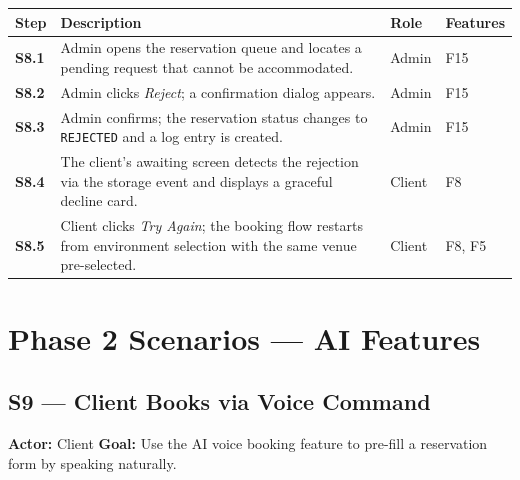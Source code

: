 \documentclass[12pt,a4paper]{article}
\begin{document}
\begin{longtable}{>{\bfseries}l L{6.5cm} l L{3cm}}
    \toprule
    Step & Description & Role & Features \\
    \midrule
    S8.1 & Admin opens the reservation queue and locates a pending
           request that cannot be accommodated. & Admin & F15 \\
    S8.2 & Admin clicks \emph{Reject}; a confirmation dialog appears. & Admin & F15 \\
    S8.3 & Admin confirms; the reservation status changes to
           \texttt{REJECTED} and a log entry is created. & Admin & F15 \\
    S8.4 & The client's awaiting screen detects the rejection via the
           storage event and displays a graceful decline card. & Client & F8 \\
    S8.5 & Client clicks \emph{Try Again}; the booking flow restarts
           from environment selection with the same venue pre-selected. & Client & F8, F5 \\
    \bottomrule
\end{longtable}

\section{Phase 2 Scenarios --- AI Features}

\subsection*{S9 --- Client Books via Voice Command}
\begin{mdframed}[style=scenariobox]
\textbf{Actor:} Client \quad
\textbf{Goal:} Use the AI voice booking feature to pre-fill a reservation
form by speaking naturally.
\end{mdframed}
\end{document}
